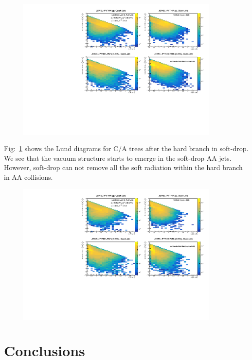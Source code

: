 \documentclass[notoc]{JHEP3}
\begin{document}
\begin{figure}
	   \centering
	   \includegraphics[width=0.9\textwidth]{plots/Individual_LundDiagrams_zrel_hardBranch.pdf}
	   \caption{}
\label{fig:Lund_hard}
\end{figure}
Fig:~\ref{fig:Lund_hard} shows the Lund diagrams for C/A trees after the hard branch in soft-drop. We see that the vacuum structure starts to emerge in the soft-drop AA jets. However, soft-drop can not remove all the soft radiation within the hard branch in AA collisions.

\begin{figure}
	   \centering
	   \includegraphics[width=0.9\textwidth]{plots/Individual_LundDiagrams_zrel_zgrg.pdf}
	   \caption{}
\label{fig:Lund_zgrg}
\end{figure}


\section{Conclusions}
\label{sec:conc}
\end{document}
